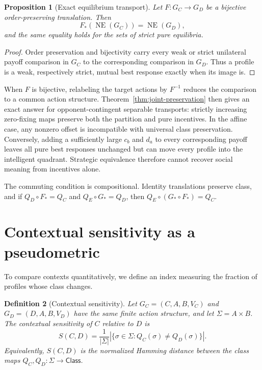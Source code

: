 \documentclass[a4paper,fleqn]{cas-dc}
\newtheorem{definition}{Definition}[section]
\newtheorem{proposition}[definition]{Proposition}
\theoremstyle{remark}
\newcommand{\Class}{\mathsf{Class}}
\newcommand{\Prof}{\Sigma}
\newcommand{\NE}{\operatorname{NE}}
\begin{document}
\begin{proposition}[Exact equilibrium transport]
\label{prop:equilibrium-transport}
Let $F:G_C\to G_D$ be a bijective order-preserving translation.  Then
\[
F_*(\NE(G_C))=\NE(G_D),
\]
and the same equality holds for the sets of strict pure equilibria.
\end{proposition}

\begin{proof}
Order preservation and bijectivity carry every weak or strict unilateral payoff
comparison in $G_C$ to the corresponding comparison in $G_D$.  Thus a profile
is a weak, respectively strict, mutual best response exactly when its image is.
\end{proof}

When $F$ is bijective, relabeling the target actions by $F^{-1}$ reduces the
comparison to a common action structure.  Theorem~\ref{thm:joint-preservation}
then gives an exact answer for opponent-contingent separable transports:
strictly increasing zero-fixing maps preserve both the partition and pure
incentives. In the affine case, any nonzero offset is incompatible with
universal class preservation. Conversely, adding
a sufficiently large $c_b$ and $d_a$ to every corresponding payoff leaves all
pure best responses unchanged but can move every profile into the intelligent
quadrant.  Strategic equivalence therefore cannot recover social meaning from
incentives alone.

The commuting condition is compositional. Identity translations preserve
class, and if $Q_D\circ F_*=Q_C$ and $Q_E\circ G_*=Q_D$, then
$Q_E\circ(G_*\circ F_*)=Q_C$.


\section{Contextual sensitivity as a pseudometric}
\label{sec:sensitivity}

To compare contexts quantitatively, we define an index measuring the fraction of profiles whose class changes.

\begin{definition}[Contextual sensitivity]
Let $G_C=(C,A,B,V_C)$ and $G_D=(D,A,B,V_D)$ have the same finite action structure, and let $\Prof=A\times B$. The contextual sensitivity of $C$ relative to $D$ is
\[
S(C,D)=\frac{1}{|\Prof|}\left|\{\sigma\in\Prof:Q_C(\sigma)\ne Q_D(\sigma)\}\right|.
\]
Equivalently, $S(C,D)$ is the normalized Hamming distance between the class maps $Q_C,Q_D:\Prof\to\Class$.
\end{definition}
\end{document}
